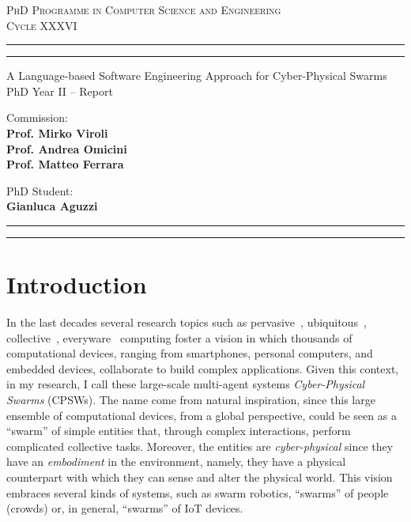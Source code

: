 \documentclass[11pt]{article}
\begin{document}
\sloppy
\begin{center}
	{{
		\Large{
			\textsc{PhD Programme in Computer Science and Engineering \\ 
			\vspace{4mm}
			Cycle XXXVI}
			}
	}} 
	\rule[0.1cm]{\textwidth}{0.1mm}
	\rule[0.4cm]{\textwidth}{0.6mm}
\end{center}

\begin{center}
	{\LARGE{A Language-based Software Engineering Approach for Cyber-Physical Swarms}} \\
	\vspace{4mm}
	{\large{PhD Year II -- Report}} 
	\vspace{4mm}
\end{center}
\vspace{8mm}
\par
\noindent
\begin{minipage}[t]{0.47\textwidth}

{\large{Commission: \\\bf
Prof. Mirko Viroli \\
Prof. Andrea Omicini \\
Prof. Matteo Ferrara} 
}
\end{minipage}
\hfill
\begin{minipage}[t]{0.47\textwidth}
	\raggedleft
	{
		\large{PhD Student: \\\bf Gianluca Aguzzi}
	}
\end{minipage}
\vspace{10mm}

{
	\raggedright
	\rule[0.1cm]{\textwidth}{0.6mm}
	\rule[0.5cm]{\textwidth}{0.1mm}
}

\newcommand{\rev}[1]{{
	#1
	}}
\section{Introduction}
In the last decades several research topics such as pervasive~\cite{pervasive},
 ubiquitous~\cite{weiser1999computer}, collective~\cite{abowd2016beyond}, everyware~\cite{greenfield2010everyware} computing 
 foster a vision in which thousands of computational devices, 
 ranging from smartphones, personal computers, and embedded devices,
 collaborate to build complex applications.
%
Given this context, in my research, I call these large-scale multi-agent systems \textit{Cyber-Physical Swarms} (CPSWs).
%
The name come from natural inspiration, since this large ensemble of computational devices, 
 from a global perspective, could be seen as a ``swarm'' of simple entities that, through complex interactions, 
 perform complicated collective tasks.
%
Moreover, the entities are \textit{cyber-physical} since they have an \textit{embodiment} in the environment, 
 namely, they have a physical counterpart with which they can sense and alter the physical world.
%
This vision embraces several kinds of systems, such as
 swarm robotics, ``swarms'' of people (crowds) or, in general, ``swarms'' of IoT devices.
\end{document}
